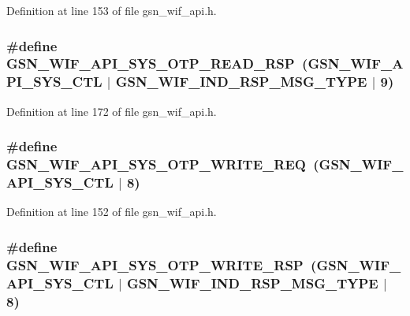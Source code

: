 Definition at line 153 of file gsn\_\-wif\_\-api.h.

\hypertarget{a00606_a68daa74a2f5d9dd92261db9b44ea3b04}{
\subsubsection[{GSN\_\-WIF\_\-API\_\-SYS\_\-OTP\_\-READ\_\-RSP}]{\setlength{\rightskip}{0pt plus 5cm}\#define GSN\_\-WIF\_\-API\_\-SYS\_\-OTP\_\-READ\_\-RSP~(GSN\_\-WIF\_\-API\_\-SYS\_\-CTL $|$ GSN\_\-WIF\_\-IND\_\-RSP\_\-MSG\_\-TYPE $|$ 9)}}
\label{a00606_a68daa74a2f5d9dd92261db9b44ea3b04}


Definition at line 172 of file gsn\_\-wif\_\-api.h.

\hypertarget{a00606_a2f161fe998e2f4e9293bb9c555d0d6d4}{
\subsubsection[{GSN\_\-WIF\_\-API\_\-SYS\_\-OTP\_\-WRITE\_\-REQ}]{\setlength{\rightskip}{0pt plus 5cm}\#define GSN\_\-WIF\_\-API\_\-SYS\_\-OTP\_\-WRITE\_\-REQ~(GSN\_\-WIF\_\-API\_\-SYS\_\-CTL $|$ 8)}}
\label{a00606_a2f161fe998e2f4e9293bb9c555d0d6d4}


Definition at line 152 of file gsn\_\-wif\_\-api.h.

\hypertarget{a00606_a915a87e97514aa78bc1fc481fa52fb13}{
\subsubsection[{GSN\_\-WIF\_\-API\_\-SYS\_\-OTP\_\-WRITE\_\-RSP}]{\setlength{\rightskip}{0pt plus 5cm}\#define GSN\_\-WIF\_\-API\_\-SYS\_\-OTP\_\-WRITE\_\-RSP~(GSN\_\-WIF\_\-API\_\-SYS\_\-CTL $|$ GSN\_\-WIF\_\-IND\_\-RSP\_\-MSG\_\-TYPE $|$ 8)}}
\label{a00606_a915a87e97514aa78bc1fc481fa52fb13}


